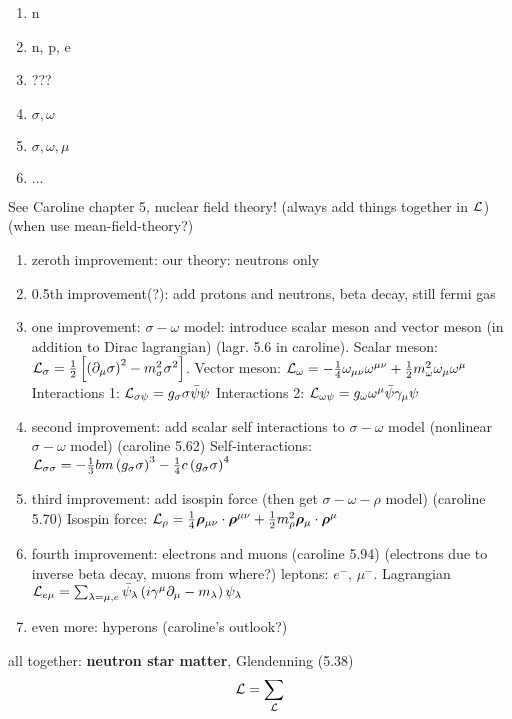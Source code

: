 \begin{enumerate}
\item n
\item n, p, e
\item ???
\item $\sigma, \omega$
\item $\sigma, \omega, \mu$
\item $\ldots$
\end{enumerate}

See Caroline chapter 5, nuclear field theory!
(always add things together in $\mathcal{L}$)
(when use mean-field-theory?)
\begin{enumerate}
\item zeroth improvement: our theory: neutrons only
\item 0.5th improvement(?): add protons and neutrons, beta decay, still fermi gas
\item one improvement: $\sigma-\omega$ model: introduce scalar meson and vector meson (in addition to Dirac lagrangian) (lagr. 5.6 in caroline).
      Scalar meson: $\mathcal{L}_\sigma = \frac12 \left[ \left( \partial_\mu \sigma \right)^2 - m_\sigma^2 \sigma^2 \right]$.
      Vector meson: $\mathcal{L}_\omega = -\frac14 \omega_{\mu\nu} \omega^{\mu\nu} + \frac12 m_\omega^2 \omega_\mu \omega^\mu$
      Interactions 1: $\mathcal{L}_{\sigma\psi} = g_\sigma \sigma \bar\psi \psi$
      Interactions 2: $\mathcal{L}_{\omega\psi} = g_\omega \omega^\mu \bar\psi \gamma_\mu \psi$
\item second improvement: add scalar self interactions to $\sigma-\omega$ model (nonlinear $\sigma-\omega$ model) (caroline 5.62)
      Self-interactions: $\mathcal{L}_{\sigma\sigma} = -\frac13 b m \left( g_\sigma \sigma \right)^3 - \frac14 c \left( g_\sigma \sigma \right)^4$
\item third improvement: add isospin force (then get $\sigma-\omega-\rho$ model) (caroline 5.70)
      Isospin force: $\mathcal{L}_\rho = \frac14 {\bm{\rho}}_{\mu\nu} \cdot {\bm{\rho}}^{\mu\nu} + \frac12 m_\rho^2 {\bm{\rho}}_\mu \cdot {\bm{\rho}}^\mu$
\item fourth improvement: electrons and muons (caroline 5.94)
      (electrons due to inverse beta decay, muons from where?)
      leptons: $e^-$, $\mu^-$.
      Lagrangian $\mathcal{L}_{e \mu} = \sum_{\lambda=\mu,e} \bar\psi_\lambda \left( i \gamma^\mu \partial_\mu - m_\lambda \right) \psi_\lambda$
\item even more: hyperons (caroline's outlook?)
\end{enumerate}
all together: \textbf{neutron star matter}, Glendenning (5.38)
\begin{equation}
	\mathcal{L} = \sum_{\mathcal{L}}
\end{equation}

